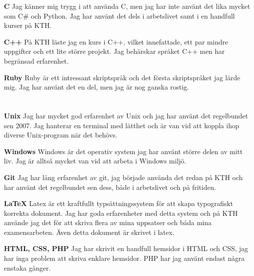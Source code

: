 \documentclass[margin,line]{resume}%
\begin{document}
\begin{resume}
		\textbf{C}\hspace{0.5cm}
		Jag känner mig trygg i att använda C, men jag har inte använt det lika mycket som
		C\# och Python. Jag har använt det dels i arbetslivet samt i en handfull kurser på KTH.

		\textbf{C++}\hspace{0.5cm}
		På KTH läste jag en kurs i C++, vilket innefattade, ett par mindre
		uppgifter och ett lite större projekt. Jag behärskar språket C++ men har
		begränsad erfarenhet.

		\textbf{Ruby}\hspace{0.5cm}
		Ruby är ett intressant skriptspråk och det första skriptspråket jag lärde
		mig. Jag har använt det en del, men jag är nog ganska rostig.

\newpage
	   \section{}\vspace{0.001mm}

		\textbf{Unix}\hspace{0.5cm}
		Jag har mycket god erfarenhet av Unix och jag har använt det regelbundet
		sen 2007. Jag hanterar en terminal med lätthet och är van
		vid att koppla ihop diverse Unix-program när det behövs.

		\textbf{Windows}\hspace{0.5cm}
		Windows är det operativ system jag har använt större delen av mitt liv.
		Jag är alltså mycket van vid att arbeta i Windows miljö.

		\textbf{Git}\hspace{0.5cm}
		Jag har lång erfarenhet av git, jag började använda det redan på KTH
		och har använt det regelbundet sen dess, både i arbetslivet och på fritiden.

		\textbf{\LaTeX}\hspace{0.5cm}
		Latex är ett kraftfullt typsättningssystem för att skapa typografiskt
		korrekta dokument. Jag har goda erfarenheter med detta system och på KTH
		använde jag det för att skriva flera av mina uppsatser och båda mina
		examensarbeten. Även detta dokument är skrivet i latex.

		\textbf{HTML, CSS, PHP}\hspace{0.5cm}
		Jag har skrivit en handfull hemsidor i HTML och CSS, jag har inga
		problem att skriva enklare hemsidor. PHP har jag använt endast
		några enstaka gånger.


\end{resume}
\end{document}
